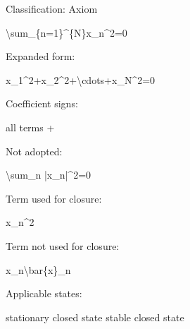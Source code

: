 \documentclass[
  a4paper,
]{article}
\newenvironment{Shaded}{}{}
\newcommand{\NormalTok}[1]{#1}
\begin{document}
Classification: Axiom

\begin{Shaded}
\begin{Highlighting}[]
\NormalTok{\textbackslash{}sum\_\{n=1\}\^{}\{N\}x\_n\^{}2=0}
\end{Highlighting}
\end{Shaded}

Expanded form:

\begin{Shaded}
\begin{Highlighting}[]
\NormalTok{x\_1\^{}2+x\_2\^{}2+\textbackslash{}cdots+x\_N\^{}2=0}
\end{Highlighting}
\end{Shaded}

Coefficient signs:

\begin{Shaded}
\begin{Highlighting}[]
\NormalTok{all terms +}
\end{Highlighting}
\end{Shaded}

Not adopted:

\begin{Shaded}
\begin{Highlighting}[]
\NormalTok{\textbackslash{}sum\_n |x\_n|\^{}2=0}
\end{Highlighting}
\end{Shaded}

Term used for closure:

\begin{Shaded}
\begin{Highlighting}[]
\NormalTok{x\_n\^{}2}
\end{Highlighting}
\end{Shaded}

Term not used for closure:

\begin{Shaded}
\begin{Highlighting}[]
\NormalTok{x\_n\textbackslash{}bar\{x\}\_n}
\end{Highlighting}
\end{Shaded}

Applicable states:

\begin{Shaded}
\begin{Highlighting}[]
\NormalTok{stationary closed state}
\NormalTok{stable closed state}
\end{Highlighting}
\end{Shaded}
\end{document}
